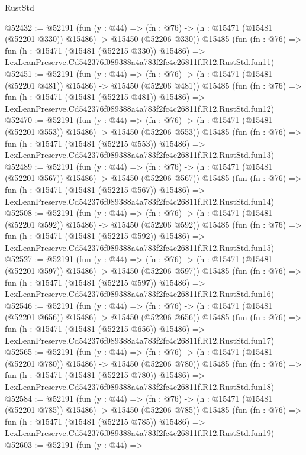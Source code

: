 \begin{lexlean}{RustStd}
\begin{coremodule}
@52432 := @52191
    (fun (y : @44) =>
    (fn : @76) -> (h : @15471 (@15481 (@52201 @330)) @15486) -> @15450 (@52206 @330))
    @15485
    (fun (fn : @76) =>
    fun (h : @15471 (@15481 (@52215 @330)) @15486) =>
    LexLeanPreserve.Cd542376f089388a4a783f2fc4c26811f.R12.RustStd.fun11)
@52451 := @52191
    (fun (y : @44) =>
    (fn : @76) -> (h : @15471 (@15481 (@52201 @481)) @15486) -> @15450 (@52206 @481))
    @15485
    (fun (fn : @76) =>
    fun (h : @15471 (@15481 (@52215 @481)) @15486) =>
    LexLeanPreserve.Cd542376f089388a4a783f2fc4c26811f.R12.RustStd.fun12)
@52470 := @52191
    (fun (y : @44) =>
    (fn : @76) -> (h : @15471 (@15481 (@52201 @553)) @15486) -> @15450 (@52206 @553))
    @15485
    (fun (fn : @76) =>
    fun (h : @15471 (@15481 (@52215 @553)) @15486) =>
    LexLeanPreserve.Cd542376f089388a4a783f2fc4c26811f.R12.RustStd.fun13)
@52489 := @52191
    (fun (y : @44) =>
    (fn : @76) -> (h : @15471 (@15481 (@52201 @567)) @15486) -> @15450 (@52206 @567))
    @15485
    (fun (fn : @76) =>
    fun (h : @15471 (@15481 (@52215 @567)) @15486) =>
    LexLeanPreserve.Cd542376f089388a4a783f2fc4c26811f.R12.RustStd.fun14)
@52508 := @52191
    (fun (y : @44) =>
    (fn : @76) -> (h : @15471 (@15481 (@52201 @592)) @15486) -> @15450 (@52206 @592))
    @15485
    (fun (fn : @76) =>
    fun (h : @15471 (@15481 (@52215 @592)) @15486) =>
    LexLeanPreserve.Cd542376f089388a4a783f2fc4c26811f.R12.RustStd.fun15)
@52527 := @52191
    (fun (y : @44) =>
    (fn : @76) -> (h : @15471 (@15481 (@52201 @597)) @15486) -> @15450 (@52206 @597))
    @15485
    (fun (fn : @76) =>
    fun (h : @15471 (@15481 (@52215 @597)) @15486) =>
    LexLeanPreserve.Cd542376f089388a4a783f2fc4c26811f.R12.RustStd.fun16)
@52546 := @52191
    (fun (y : @44) =>
    (fn : @76) -> (h : @15471 (@15481 (@52201 @656)) @15486) -> @15450 (@52206 @656))
    @15485
    (fun (fn : @76) =>
    fun (h : @15471 (@15481 (@52215 @656)) @15486) =>
    LexLeanPreserve.Cd542376f089388a4a783f2fc4c26811f.R12.RustStd.fun17)
@52565 := @52191
    (fun (y : @44) =>
    (fn : @76) -> (h : @15471 (@15481 (@52201 @780)) @15486) -> @15450 (@52206 @780))
    @15485
    (fun (fn : @76) =>
    fun (h : @15471 (@15481 (@52215 @780)) @15486) =>
    LexLeanPreserve.Cd542376f089388a4a783f2fc4c26811f.R12.RustStd.fun18)
@52584 := @52191
    (fun (y : @44) =>
    (fn : @76) -> (h : @15471 (@15481 (@52201 @785)) @15486) -> @15450 (@52206 @785))
    @15485
    (fun (fn : @76) =>
    fun (h : @15471 (@15481 (@52215 @785)) @15486) =>
    LexLeanPreserve.Cd542376f089388a4a783f2fc4c26811f.R12.RustStd.fun19)
@52603 := @52191
    (fun (y : @44) =>

\end{coremodule}
\end{lexlean}
